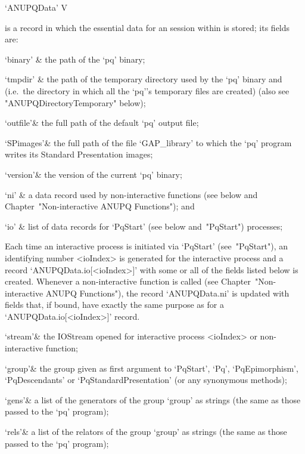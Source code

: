 \>`ANUPQData' V

is a {\GAP} record in which the essential data for  an  {\ANUPQ}  session
within {\GAP} is stored; its fields are:

\beginitems

\quad`binary' & the path of the `pq' binary;

\quad`tmpdir' & the path of the temporary  directory  used  by  the  `pq'
binary and {\GAP} (i.e.~the directory in which all the  `pq''s  temporary
files are created) (also see "ANUPQDirectoryTemporary" below);

\quad`outfile'& the full path of the default `pq' output  file;

\quad`SPimages'& the full path of the file  `GAP_library'  to  which  the
`pq' program writes its Standard Presentation images;

\quad`version'& the version of the current `pq' binary;

\quad`ni' & a data record used by non-interactive  functions  (see  below
and Chapter~"Non-interactive ANUPQ Functions"); and

\quad`io' & list of data records for `PqStart' (see below  and~"PqStart")
processes;

\enditems

Each time an interactive {\ANUPQ}  process  is  initiated  via  `PqStart'
(see~"PqStart"), an identifying number <ioIndex>  is  generated  for  the
interactive process and a record `ANUPQData.io[<ioIndex>]' with  some  or
all of the fields listed below is  created.  Whenever  a  non-interactive
function is called (see Chapter~"Non-interactive ANUPQ  Functions"),  the
record `ANUPQData.ni' is updated with fields that, if bound, have exactly
the same purpose as for a `ANUPQData.io[<ioIndex>]' record. 

\beginitems

\quad`stream'& the  IOStream  opened  for  interactive  {\ANUPQ}  process
<ioIndex> or non-interactive {\ANUPQ} function;

\quad`group'& the group given  as  first  argument  to  `PqStart',  `Pq',
`PqEpimorphism',  `PqDescendants'  or  `PqStandardPresentation'  (or  any
synonymous methods);

\quad`gens'& a list of the generators of the  group  `group'  as  strings
(the same as those passed to the `pq' program);

\quad`rels'& a list of the relators of the group `group' as strings  (the
same as those passed to the `pq' program);

